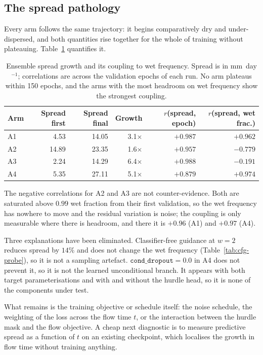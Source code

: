 \subsection{The spread pathology}
\label{sec:abl-spread}

Every arm follows the same trajectory: it begins comparatively dry and
under-dispersed, and both quantities rise together for the whole of training
without plateauing. Table~\ref{tab:ablation-spread} quantifies it.

\begin{table}[htbp]
\centering
\caption{Ensemble spread growth and its coupling to wet frequency. Spread is in
mm~day$^{-1}$; correlations are across the validation epochs of each run. No arm
plateaus within 150 epochs, and the arms with the most headroom on wet frequency
show the strongest coupling.}
\label{tab:ablation-spread}
\begin{tabular}{lrrrrr}
\hline
Arm & Spread first & Spread final & Growth & $r$(spread, epoch) & $r$(spread, wet frac.) \\
\hline
A1 & 4.53 & 14.05 & 3.1$\times$ & $+0.987$ & $+0.962$ \\
A2 & 14.89 & 23.35 & 1.6$\times$ & $+0.957$ & $-0.779$ \\
A3 & 2.24 & 14.29 & 6.4$\times$ & $+0.988$ & $-0.191$ \\
A4 & 5.35 & 27.11 & 5.1$\times$ & $+0.879$ & $+0.974$ \\
\hline
\end{tabular}
\end{table}

The negative correlations for A2 and A3 are not counter-evidence. Both are
saturated above $0.99$ wet fraction from their first validation, so the wet
frequency has nowhere to move and the residual variation is noise; the coupling
is only measurable where there is headroom, and there it is $+0.96$ (A1) and
$+0.97$ (A4).

Three explanations have been eliminated. Classifier-free guidance at $w=2$
reduces spread by $14\%$ and does not change the wet frequency
(Table~\ref{tab:cfg-probe}), so it is not a sampling artefact.
$\texttt{cond\_dropout}=0.0$ in A4 does not prevent it, so it is not the learned
unconditional branch. It appears with both target parameterisations and with and
without the hurdle head, so it is none of the components under test.

What remains is the training objective or schedule itself: the noise schedule,
the weighting of the loss across the flow time $t$, or the interaction between
the hurdle mask and the flow objective. A cheap next diagnostic is to measure
predictive spread as a function of $t$ on an existing checkpoint, which
localises the growth in flow time without training anything.


